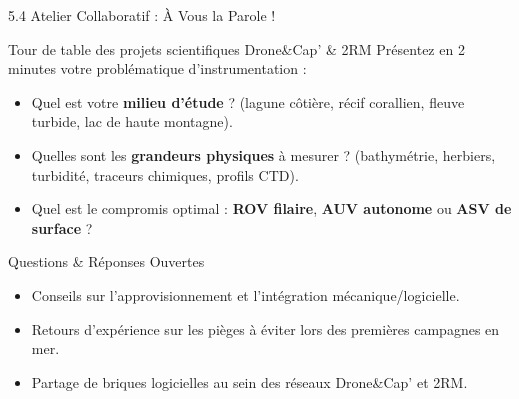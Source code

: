 \begin{frame}{5.4 Atelier Collaboratif : À Vous la Parole !}
  \begin{block}{Tour de table des projets scientifiques Drone\&Cap' \& 2RM}
    Présentez en 2 minutes votre problématique d'instrumentation :
    \begin{itemize}
      \item Quel est votre \textbf{milieu d'étude} ? (lagune côtière, récif corallien, fleuve turbide, lac de haute montagne).
      \item Quelles sont les \textbf{grandeurs physiques} à mesurer ? (bathymétrie, herbiers, turbidité, traceurs chimiques, profils CTD).
      \item Quel est le compromis optimal : \textbf{ROV filaire}, \textbf{AUV autonome} ou \textbf{ASV de surface} ?
    \end{itemize}
  \end{block}

  \vspace{0.6em}
  \begin{exampleblock}{Questions \& Réponses Ouvertes}
    \begin{itemize}
      \item Conseils sur l'approvisionnement et l'intégration mécanique/logicielle.
      \item Retours d'expérience sur les pièges à éviter lors des premières campagnes en mer.
      \item Partage de briques logicielles au sein des réseaux Drone\&Cap' et 2RM.
    \end{itemize}
  \end{exampleblock}

\end{frame}
